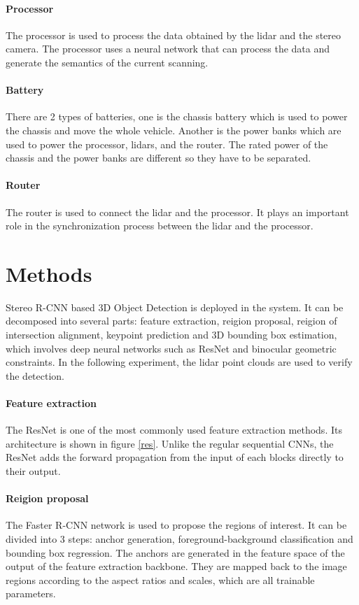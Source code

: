 \documentclass[balance,upint,subscriptcorrection,varvw,nofoot, mathalfa=cal=boondoxo,spanish,french,vietnamese,russian,greek,pdf-a,fontspec,colorlinks]{asmeconf}
\begin{document}
\paragraph{Processor} The processor is used to process the data obtained by the lidar and the stereo camera. The processor uses a neural network that can process the data and generate the semantics of the current scanning.
\paragraph{Battery} There are 2 types of batteries, one is the chassis battery which is used to power the chassis and move the whole vehicle. Another is the power banks which are used to power the processor, lidars, and the router. The rated power of the chassis and the power banks are different so they have to be separated.
\paragraph{Router} The router is used to connect the lidar and the processor. It plays an important role in the synchronization process between the lidar and the processor.


\section{Methods}

Stereo R-CNN based 3D Object Detection \cite{DBLP:journals/corr/abs-1902-09738} is deployed in the system. It can be decomposed into several parts: feature extraction, reigion proposal, reigion of intersection alignment, keypoint prediction and 3D bounding box estimation, which involves deep neural networks such as ResNet and binocular geometric constraints. In the following experiment, the lidar point clouds are used to verify the detection.
\paragraph{Feature extraction} The ResNet \cite{7780459} is one of the most commonly used feature extraction methods. Its architecture is shown in figure \ref{res}. Unlike the regular sequential CNNs, the ResNet adds the forward propagation from the input of each blocks directly to their output. 
\paragraph{Reigion proposal} The Faster R-CNN network\cite{DBLP:journals/corr/RenHG015} is used to propose the regions of interest. It can be divided into 3 steps: anchor generation, foreground-background classification and bounding box regression. The anchors are generated in the feature space of the output of the feature extraction backbone. They are mapped back to the image regions according to the aspect ratios and scales, which are all trainable parameters. 
\end{document}
